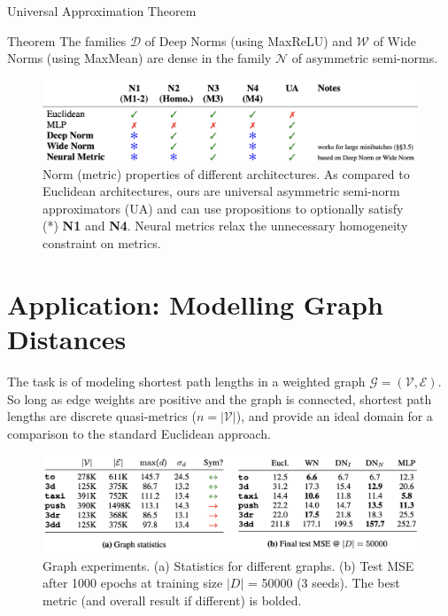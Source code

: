 \documentclass{beamer}
\begin{document}
\begin{frame}{Universal Approximation Theorem}
    \begin{block}{Theorem}
        The families $\mathcal{D}$ of Deep Norms (using MaxReLU)
and $\mathcal{W}$ of Wide Norms (using MaxMean) are dense in the family $\mathcal{N}$ of asymmetric semi-norms.
    \end{block}

\begin{figure}
    \centering
    \includegraphics[width=\linewidth]{3.png}
    \caption{Norm (metric) properties of different architectures. As compared to Euclidean architectures,
ours are universal asymmetric semi-norm approximators (UA) and can use propositions to optionally
satisfy (*) \textbf{N1} and \textbf{N4}. Neural metrics relax the unnecessary homogeneity constraint on metrics.}
    \label{fig:enter-label}
\end{figure}
    
\end{frame}

\section{Application: Modelling Graph Distances}

\begin{frame}
    \begin{block}{}
    The task is of modeling shortest path lengths in a weighted graph $\mathcal{G} = (\mathcal{V}, \mathcal{E})$. So long as edge weights are
    positive and the graph is connected, shortest path lengths are discrete quasi-metrics ($n = |\mathcal{V}|$), and
    provide an ideal domain for a comparison to the standard Euclidean approach.
    \end{block}


\begin{figure}
    \centering
    \includegraphics[width=\linewidth]{4.png}
    \caption{Graph experiments. (a) Statistics for different graphs. (b) Test MSE after 1000 epochs at
training size $|D|$ = 50000 (3 seeds). The best metric (and overall result if different) is bolded.}
    \label{fig:enter-label}
\end{figure}

\end{frame}
\end{document}
